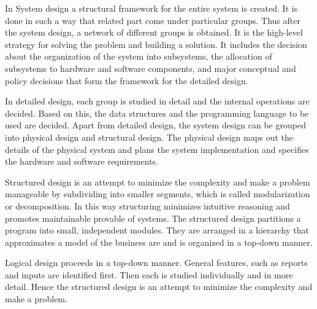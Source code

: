 \documentclass[12pt,a4paper,oneside]{report}
\begin{document}
 In System design a structural framework for the entire system is created. It is done in
such a way that related part come under particular groups. Thus after the system design, a
network of different groups is obtained. It is the high-level strategy for solving the problem
and building a solution. It includes the decision about the organization of the system into
subsystems, the allocation of subsystems to hardware and software components, and major
conceptual and policy decisions that form the framework for the detailed design.
\par In detailed design, each group is studied in detail and the internal operations are decided.
Based on this, the data structures and the programming language to be used are decided. Apart
from detailed design, the system design can be grouped into physical design and structural
design. The physical design maps out the details of the physical system and plans the system
implementation and specifies the hardware and software requirements.
\par Structured design is an attempt to minimize the complexity and make a problem manageable
by subdividing into smaller segments, which is called modularization or decomposition.
In this way structuring minimizes intuitive reasoning and promotes maintainable provable of systems. The structured design partitions a program into small, independent modules. They
are arranged in a hierarchy that approximates a model of the business are and is organized in a
top-down manner.
\par Logical design proceeds in a top-down manner. General features, such as reports and
inputs are identified first. Then each is studied individually and in more detail. Hence the
structured design is an attempt to minimize the complexity and make a problem.
\end{document}
